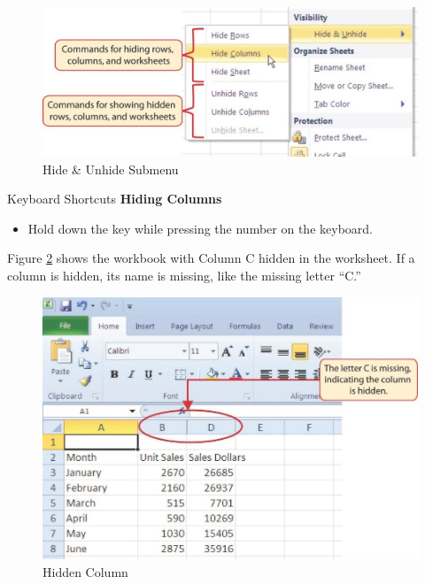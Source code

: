 \begin{figure}[H]
	\centering
	\includegraphics[width=\maxwidth{.95\linewidth}]{gfx/ch01_fig26}
	\caption{Hide \& Unhide Submenu}
	\label{01:fig26}
\end{figure}

\begin{center}
	\begin{shtcutbox}{Keyboard Shortcuts}
		\textbf{Hiding Columns}
		\\
		\begin{itemize}
			\setlength{\itemsep}{0pt}
			\setlength{\parskip}{0pt}
			\setlength{\parsep}{0pt}
			
			\item Hold down the  key while pressing the number  on the keyboard.
			
		\end{itemize}
	\end{shtcutbox}
\end{center}

Figure \ref{01:fig27} shows the workbook with Column C hidden in the  worksheet. If a column is hidden, its name is missing, like the missing letter ``C.''

\begin{figure}[H]
	\centering
	\includegraphics[width=\maxwidth{.95\linewidth}]{gfx/ch01_fig27}
	\caption{Hidden Column}
	\label{01:fig27}
\end{figure}

